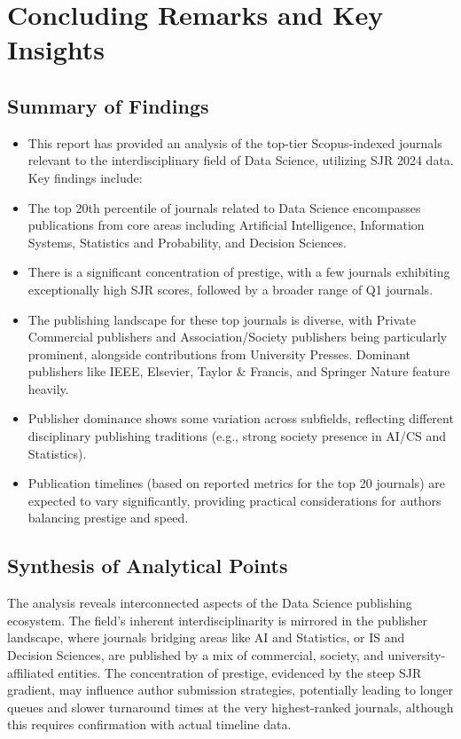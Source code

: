 \documentclass[../main.tex]{subfiles}
\begin{document}
\section{Concluding Remarks and Key Insights}

\subsection{Summary of Findings}
\begin{itemize}
    \item This report has provided an analysis of the top-tier Scopus-indexed journals relevant to the interdisciplinary field of Data Science, utilizing SJR 2024 data. Key findings include:

    \item The top 20th percentile of journals related to Data Science encompasses publications from core areas including Artificial Intelligence, Information Systems, Statistics and Probability, and Decision Sciences.

    \item There is a significant concentration of prestige, with a few journals exhibiting exceptionally high SJR scores, followed by a broader range of Q1 journals.

    \item The publishing landscape for these top journals is diverse, with Private Commercial publishers and Association/Society publishers being particularly prominent, alongside contributions from University Presses. Dominant publishers like IEEE, Elsevier, Taylor \& Francis, and Springer Nature feature heavily.

    \item Publisher dominance shows some variation across subfields, reflecting different disciplinary publishing traditions (e.g., strong society presence in AI/CS and Statistics).

    \item Publication timelines (based on reported metrics for the top 20 journals) are expected to vary significantly, providing practical considerations for authors balancing prestige and speed.
\end{itemize}

\subsection{Synthesis of Analytical Points}

\vspace{0.4cm}
\noindent
The analysis reveals interconnected aspects of the Data Science publishing ecosystem. The field's inherent interdisciplinarity is mirrored in the publisher landscape, where journals bridging areas like AI and Statistics, or IS and Decision Sciences, are published by a mix of commercial, society, and university-affiliated entities. The concentration of prestige, evidenced by the steep SJR gradient, may influence author submission strategies, potentially leading to longer queues and slower turnaround times at the very highest-ranked journals, although this requires confirmation with actual timeline data. 
\end{document}

